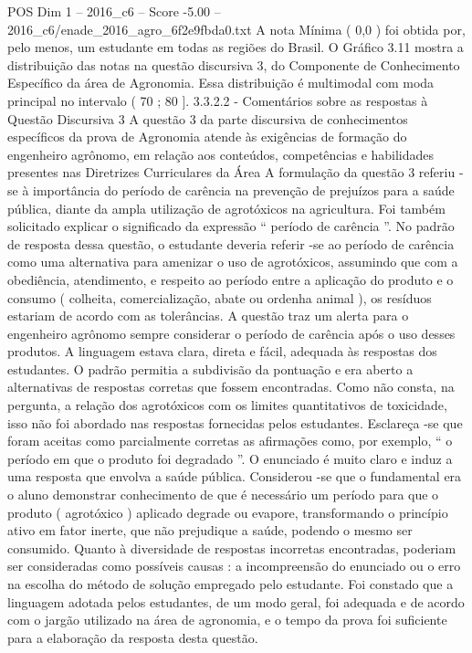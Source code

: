\begin{textsample}{POS Dim 1 – 2016\_c6 – Score -5.00 – 2016\_c6/enade\_2016\_agro\_6f2e9fbda0.txt}
A nota Mínima ( 0,0 ) foi obtida por, pelo menos, um estudante em todas as regiões do Brasil.
O Gráfico 3.11 mostra a distribuição das notas na questão discursiva 3, do Componente de Conhecimento Específico da área de Agronomia.
Essa distribuição é multimodal com moda principal no intervalo ( 70 ; 80 ]. 3.3.2.2 - Comentários sobre as respostas à Questão Discursiva 3 A questão 3 da parte discursiva de conhecimentos específicos da prova de Agronomia atende às exigências de formação do engenheiro agrônomo, em relação aos conteúdos, competências e habilidades presentes nas Diretrizes Curriculares da Área A formulação da questão 3 referiu -se à importância do período de carência na prevenção de prejuízos para a saúde pública, diante da ampla utilização de agrotóxicos na agricultura.
Foi também solicitado explicar o significado da expressão “ período de carência ”.
No padrão de resposta dessa questão, o estudante deveria referir -se ao período de carência como uma alternativa para amenizar o uso de agrotóxicos, assumindo que com a obediência, atendimento, e respeito ao período entre a aplicação do produto e o consumo ( colheita, comercialização, abate ou ordenha animal ), os resíduos estariam de acordo com as tolerâncias.
A questão traz um alerta para o engenheiro agrônomo sempre considerar o período de carência após o uso desses produtos.
A linguagem estava clara, direta e fácil, adequada às respostas dos estudantes.
O padrão permitia a subdivisão da pontuação e era aberto a alternativas de respostas corretas que fossem encontradas.
Como não consta, na pergunta, a relação dos agrotóxicos com os limites quantitativos de toxicidade, isso não foi abordado nas respostas fornecidas pelos estudantes.
Esclareça -se que foram aceitas como parcialmente corretas as afirmações como, por exemplo, “ o período em que o produto foi degradado ”.
O enunciado é muito claro e induz a uma resposta que envolva a saúde pública.
Considerou -se que o fundamental era o aluno demonstrar conhecimento de que é necessário um período para que o produto ( agrotóxico ) aplicado degrade ou evapore, transformando o princípio ativo em fator inerte, que não prejudique a saúde, podendo o mesmo ser consumido.
Quanto à diversidade de respostas incorretas encontradas, poderiam ser consideradas como possíveis causas : a incompreensão do enunciado ou o erro na escolha do método de solução empregado pelo estudante.
Foi constado que a linguagem adotada pelos estudantes, de um modo geral, foi adequada e de acordo com o jargão utilizado na área de agronomia, e o tempo da prova foi suficiente para a elaboração da resposta desta questão.

\end{textsample}
